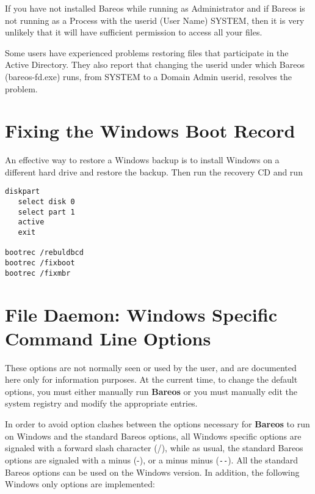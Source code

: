 If you have not installed Bareos while running as Administrator
and if Bareos is not running as a Process with the userid (User Name) SYSTEM,
then it is very unlikely that it will have sufficient permission to
access all your files.

Some users have experienced problems restoring files that participate in
the Active Directory. They also report that changing the userid under which
Bareos (bareos-fd.exe) runs, from SYSTEM to a Domain Admin userid, resolves
the problem.



\section{Fixing the Windows Boot Record}

An effective way to restore a Windows backup is to install Windows on a different
hard drive and restore the backup.  Then run the
recovery CD and run

\begin{verbatim}
diskpart
   select disk 0
   select part 1
   active
   exit

bootrec /rebuldbcd
bootrec /fixboot
bootrec /fixmbr
\end{verbatim}


\section{File Daemon: Windows Specific Command Line Options}

These options are not normally seen or used by the user, and are documented
here only for information purposes. At the current time, to change the default
options, you must either manually run {\bf Bareos} or you must manually edit
the system registry and modify the appropriate entries.

In order to avoid option clashes between the options necessary for {\bf
Bareos} to run on Windows and the standard Bareos options, all Windows
specific options are signaled with a forward slash character (/), while as
usual, the standard Bareos options are signaled with a minus (-), or a minus
minus (\verb:--:). All the standard Bareos options can be used on the Windows
version. In addition, the following Windows only options are implemented:


